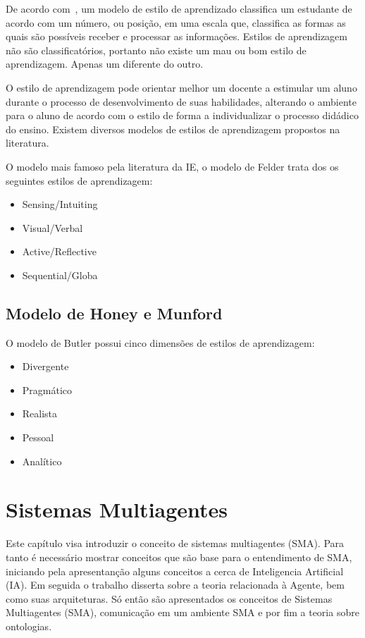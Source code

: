 De acordo com~\cite{felder1988learning}, um modelo de estilo de aprendizado classifica um estudante de acordo com um número, ou posição, em uma escala que, classifica as formas as quais são possíveis receber e processar as informações. Estilos de aprendizagem não são classificatórios, portanto não existe um mau ou bom estilo de aprendizagem. Apenas um diferente do outro.

O estilo de aprendizagem pode orientar melhor um docente a estimular um aluno durante o processo de desenvolvimento de suas habilidades, alterando o ambiente para o aluno de acordo com o estilo de forma a individualizar o processo didádico do ensino. Existem diversos modelos de estilos de aprendizagem propostos na literatura.

O modelo mais famoso pela literatura da IE, o modelo de Felder trata dos os seguintes estilos de aprendizagem:
\begin{itemize}
	\item Sensing/Intuiting
	\item Visual/Verbal
	\item Active/Reflective
	\item Sequential/Globa
\end{itemize}

\subsection{Modelo de Honey e Munford}
 O modelo de Butler possui cinco dimensões de estilos de aprendizagem:
\begin{itemize}
	\item Divergente
	\item Pragmático
	\item Realista
	\item Pessoal
	\item Analítico
\end{itemize}


\section{Sistemas Multiagentes}

Este capítulo visa introduzir o conceito de sistemas multiagentes (SMA). Para tanto é necessário mostrar conceitos que são base para o entendimento de SMA, iniciando pela apresentanção alguns conceitos a cerca de Inteligencia Artificial (IA). Em seguida o trabalho disserta sobre a teoria relacionada à Agente, bem como suas arquiteturas. Só então são apresentados os conceitos de Sistemas Multiagentes (SMA), comunicação em um ambiente SMA e por fim a teoria sobre ontologias.


